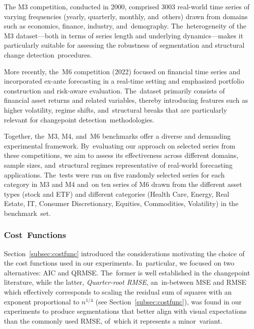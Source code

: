 \documentclass[mathematics,article,accept,pdftex,moreauthors]{Definitions/mdpi}
\begin{document}
The M3 competition, conducted in 2000, comprised 3003 real-world time series of varying frequencies (yearly, quarterly, monthly, and~others) drawn from domains such as economics, finance, industry, and~demography. The~heterogeneity of the M3 dataset—both in terms of series length and underlying dynamics—makes it particularly suitable for assessing the robustness of segmentation and structural change detection~procedures.


More recently, the~M6 competition (2022) focused on financial time series and incorporated ex-ante forecasting in a real-time setting and emphasized portfolio construction and risk-aware evaluation. The~dataset primarily consists of financial asset returns and related variables, thereby introducing features such as higher volatility, regime shifts, and~structural breaks that are particularly relevant for changepoint detection~methodologies.

Together, the~M3, M4, and~M6 benchmarks offer a diverse and demanding experimental framework. By~evaluating our approach on selected series from these competitions, we aim to assess its effectiveness across different domains, sample sizes, and~structural regimes representative of real-world forecasting applications. The~tests were run on five randomly selected series for each category in M3 and M4 and~on ten series of M6 drawn from the different asset types (stock and ETF) and different categories (Health Care, Energy, Real Estate, IT, Consumer Discretionary, Equities, Commodities, Volatility) in the benchmark~set.

\subsubsection{Cost~Functions}

Section~\ref{subsec:costfunc} introduced the considerations motivating the choice of the cost functions used in our experiments. In~particular, we focused on two alternatives: AIC and QRMSE. The~former is well established in the changepoint literature, while the latter, {\it Quarter-root RMSE}, an~in-between MSE and RMSE which effectively corresponds to scaling the residual sum of squares with an exponent proportional to $n^{1/4}$ (see Section~\ref{subsec:costfunc}), was found in our experiments to produce segmentations that better align with visual expectations than the commonly used RMSE, of~which it represents a minor~variant. 
\end{document}

